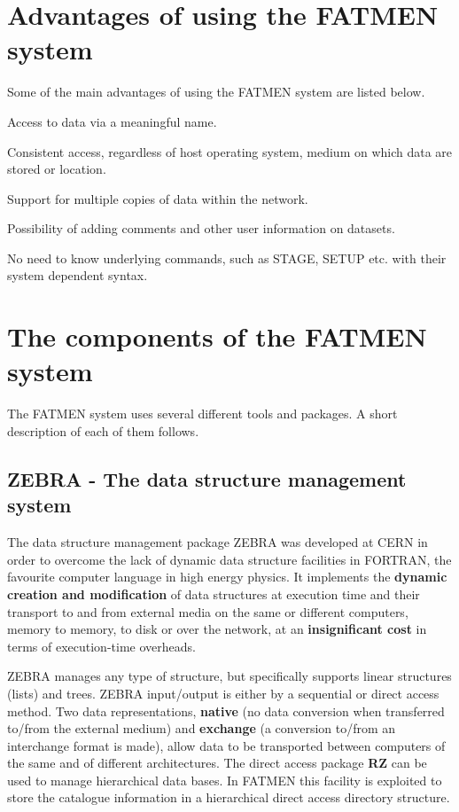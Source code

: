 \section{Advantages of using the FATMEN system}
\par
Some of the main advantages of using the FATMEN system are listed below.
\begin{UL}
\item Access to data via a meaningful name.
\item Consistent access, regardless of host operating system,
medium on which data are stored or location.
\item Support for multiple copies of data within the network.
\item Possibility of adding comments and other user information on datasets.
\item No need to know underlying commands, such as STAGE, SETUP etc. with
their system dependent syntax.
\end{UL}
\section{The components of the FATMEN system}
\par
The FATMEN system uses several different tools and packages.
A short description of each of them follows.
\subsection{ZEBRA - The data structure management system}
\par
{}
The data structure management package ZEBRA
was developed at CERN in order to overcome the lack of dynamic
data structure facilities in FORTRAN, the favourite computer language
in high energy physics. It implements the {\bf dynamic
creation and modification} of data structures at execution time
and their transport
to and from external media on the same or different computers, memory
to memory, to disk or over the network, at an
{\bf insignificant cost} in terms of execution-time overheads.
\par ZEBRA manages any type of structure, but specifically
supports linear structures (lists) and trees.
ZEBRA input/output is either by a sequential or direct access method.
Two data representations,
{\bf native} (no data conversion when transferred to/from the
external medium) and {\bf exchange} (a conversion to/from an
interchange format is made), allow data to be transported between
computers of the same and of different architectures.
The direct access package {\bf RZ} can be used
to manage hierarchical data bases. In FATMEN this facility is exploited
to store the catalogue information in a hierarchical direct access
directory structure.
